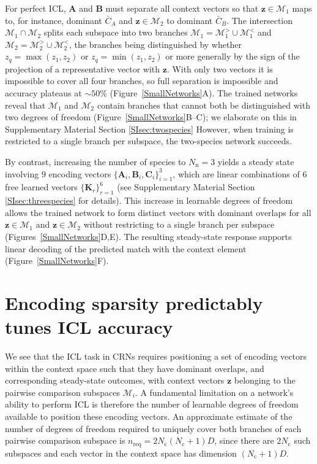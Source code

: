 \documentclass[%
reprint,
superscriptaddress,
amsmath,amssymb,
aps,
]{revtex4-2}
\begin{document}
	For perfect ICL, $\mathbf{A}$ and $\mathbf{B}$ must separate all context vectors so that $\mathbf{z}\in\mathcal{M}_1$ maps to, for instance, dominant $\bar{C}_A$ and $\mathbf{z}\in\mathcal{M}_2$ to dominant $\bar{C}_B$. The intersection $\mathcal{M}_1 \cap \mathcal{M}_2$ splits each subspace into two branches $\mathcal{M}_1 = \mathcal{M}_1^> \cup \mathcal{M}_1^<$ and $\mathcal{M}_2 = \mathcal{M}_2^> \cup \mathcal{M}_2^<$, the branches being distinguished by whether $z_q = \max(z_1, z_2)$ or $z_q = \min(z_1, z_2)$ or more generally by the sign of the projection of a representative vector with $\mathbf{z}$.  With only two vectors it is impossible to cover all four branches, so full separation is impossible and accuracy plateaus at $\sim 50\%$ (Figure~\ref{SmallNetworks}A). The trained networks reveal that $\mathcal{M}_1$ and $\mathcal{M}_2$ contain branches that cannot both be distinguished with two degrees of freedom (Figure~\ref{SmallNetworks}B–C); we elaborate on this in Supplementary Material Section \ref{SIsec:twospecies}  However, when training is restricted to a single branch per subspace, the two-species network succeeds.
	
	By contrast, increasing the number of species to $N_\text{n} = 3$ yields a steady state involving $9$ encoding vectors $\{\mathbf{A}_i, \mathbf{B}_i, \mathbf{C}_i\}_{i=1}^3$, which are linear combinations of 6 free learned vectors $\{\mathbf{K}_r\}_{r=1}^6$ (see Supplementary Material Section \ref{SIsec:threespecies} for details).  This increase in learnable degrees of freedom allows the trained network to form distinct vectors with dominant overlaps for all $\mathbf{z} \in \mathcal{M}_1$ and $\mathbf{z} \in \mathcal{M}_2$ without restricting to a single branch per subspace (Figures~\ref{SmallNetworks}D,E).  The resulting steady-state response supports linear decoding of the predicted match with the context element (Figure~\ref{SmallNetworks}F).
	
	\section{Encoding sparsity predictably tunes ICL accuracy}\label{sec:sparsity}
	
	We see that the ICL task in CRNs requires positioning a set of encoding vectors within the context space such that they have dominant overlaps, and corresponding steady-state outcomes, with context vectors $\mathbf{z}$ belonging to the pairwise comparison subspaces $\mathcal{M}_i$. A fundamental limitation on a network’s ability to perform ICL is therefore the number of learnable degrees of freedom available to position these encoding vectors. An approximate estimate of the number of degrees of freedom required to uniquely cover both branches of each pairwise comparison subspace is $n_\text{req} = 2N_\text{c}(N_\text{c}+1)D$, since there are $2N_\text{c}$ such subspaces and each vector in the context space has dimension $(N_\text{c}+1)D$.
	
\end{document}
